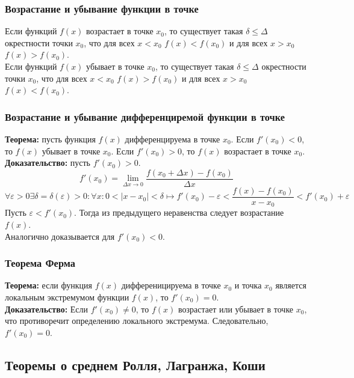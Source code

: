\documentclass{article}
\newcommand{\theorem}{\textbf{Теорема:} }
\newcommand{\proof}{\textbf{Доказательство:} }
\begin{document}
        \subsubsection*{Возрастание и убывание функции в точке}
        Если функций $f(x)$ возрастает в точке $x_0$, то существует такая $\delta \le \Delta$ окрестности точки $x_0$,
        что для всех $x < x_0$ $f(x) < f(x_0)$ и для всех $x > x_0$ $f(x) > f(x_0)$.
        \\
        Если функций $f(x)$ убывает в точке $x_0$, то существует такая $\delta \le \Delta$ окрестности точки $x_0$,
        что для всех $x < x_0$ $f(x) > f(x_0)$ и для всех $x > x_0$ $f(x) < f(x_0)$.
        
        \subsubsection*{Возрастание и убывание дифференциремой функции в точке}
        \theorem пусть функция $f(x)$ дифференцируема в точке $x_0$. Если $f'(x_0) < 0$, то $f(x)$ убывает в точке $x_0$.
        Если $f'(x_0) > 0$, то $f(x)$ возрастает в точке $x_0$.
        \\
        \proof пусть $f'(x_0) > 0$.
        \[ f'(x_0) = \lim_{\Delta x \to 0} \frac{f(x_0 + \Delta x) - f(x_0)}{\Delta x} \]
        \[ \forall \varepsilon > 0 \exists \delta = \delta(\varepsilon) > 0: \forall x: 0 < |x - x_0| < \delta \longmapsto
        f'(x_0) - \varepsilon < \frac{f(x) - f(x_0)}{x - x_0} < f'(x_0) + \varepsilon \]
        Пусть $\varepsilon < f'(x_0)$. Тогда из предыдущего неравенства следует возрастание $f(x)$.
        \\
        Аналогично доказывается для  $f'(x_0) < 0$.

        \subsubsection*{Теорема Ферма}
        \theorem если функция $f(x)$ дифференицируема в точке $x_0$ и точка $x_0$ является локальным экстремумом функции $f(x)$, то $f'(x_0) = 0$.
        \\
        \proof Если $f'(x_0) \ne 0$, то $f(x)$ возрастает или убывает в точке $x_0$, что противоречит определению локального экстремума.
        Следовательно, $f'(x_0) = 0$.


    \subsection*{Теоремы о среднем Ролля, Лагранжа, Коши}
\end{document}
